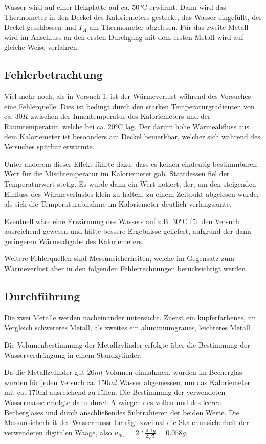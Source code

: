 \documentclass[
  9pt,
]{article}
\begin{document}
Wasser wird auf einer Heizplatte auf ca. 50°C erwärmt. Dann wird das
Thermometer in den Deckel des Kaloriemeters gesteckt, das Wasser
eingefüllt, der Deckel geschlossen und \(T_A\) am Thermometer abgelesen.
Für das zweite Metall wird im Anschluss an den ersten Durchgang mit dem
ersten Metall wird auf gleiche Weise verfahren.

\hypertarget{fehlerbetrachtung-1}{%
\subsection{Fehlerbetrachtung}\label{fehlerbetrachtung-1}}

Viel mehr noch, als in Versuch 1, ist der Wärmeverlust während des
Versuches eine Fehlerquelle. Dies ist bedingt durch den starken
Temperaturgradienten von ca. \(30K\) zwischen der Innentemperatur des
Kaloriemeters und der Raumtemperatur, welche bei ca. 20°C lag. Der darum
hohe Wärmeabfluss aus dem Kaloriemeter ist besoonders am Deckel
bemerkbar, welcher sich während des Versuches spürbar erwärmte.

Unter anderem dieser Effekt führte dazu, dass es keinen eindeutig
bestimmbaren Wert für die Mischtemperatur im Kaloriemeter gab.
Stattdessen fiel der Temperaturwert stetig. Es wurde dann ein Wert
notiert, der, um den steigenden Einfluss des Wärmeverlustes klein zu
halten, zu einem Zeitpukt abgelesen wurde, als sich die
Temperaturabnahme im Kaloriemeter deutlich verlangsamte.

Eventuell wäre eine Erwärmung des Wassers auf z.B. 30°C für den Versuch
ausreichend gewesen und hätte bessere Ergebnisse geliefert, aufgrund der
dann geringeren Wärmeabgabe des Kaloriemeters.

Weitere Fehlerquellen sind Messunsicherheiten, welche im Gegensatz zum
Wärmeverlust aber in den folgenden Fehlerrechnungen berücksichtigt
werden.

\hypertarget{durchfuxfchrung}{%
\subsection{Durchführung}\label{durchfuxfchrung}}

Die zwei Metalle werden nacheinander untersucht. Zuerst ein
kupferfarbenes, im Vergleich schwereres Metall, als zweites ein
aluminiumgraues, leichteres Metall.

Die Volumenbestimmung der Metallzylinder erfolgte über die Bestimmung
der Wasserverdrängung in einem Standzylinder.

Da die Metallzylinder gut \(20ml\) Volumen einnahmen, wurden im
Becherglas wurden für jeden Versuch ca. \(150ml\) Wasser abgemessen, um
das Kaloriemeter mit ca. 170ml ausreichend zu füllen. Die Bestimmung der
verwendeten Wassermasse erfolgte dann durch Abwiegen des vollen und des
leeren Becherglases und durch anschließendes Subtrahieren der beiden
Werte. Die Messunsicherheit der Wassermasse beträgt zweimal die
Skalenunsicherheit der verwendeten digitalen Waage, also
\(u_{m_w}=2*\frac{0,1g}{2\sqrt{3}}=0.058g\).
\end{document}
